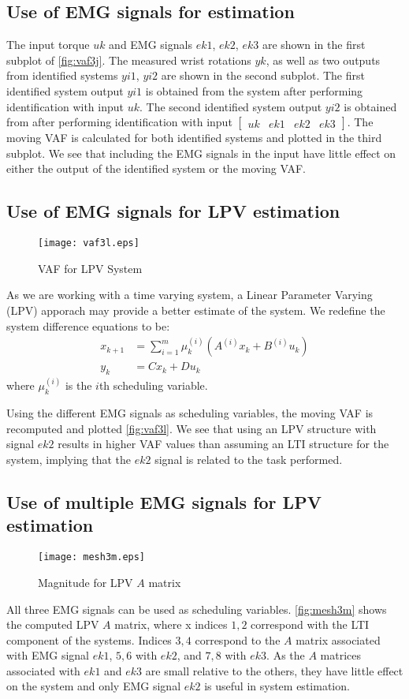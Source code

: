 \documentclass[11pt,a4paper]{article}
\begin{document}
\subsection{Use of EMG signals for estimation}
The input torque $uk$ and EMG signals $ek1$, $ek2$, $ek3$ are shown in the
first subplot of \autoref{fig:vaf3j}. The measured wrist rotations $yk$, as
well as two outputs from identified systems $yi1$, $yi2$ are shown in the
second subplot. The first identified system output $yi1$ is obtained from the
system after performing identification with input $uk$. The second identified
system output $yi2$ is obtained from after performing identification with input
$\begin{bmatrix} uk & ek1 & ek2 & ek3 \end{bmatrix}$. The moving VAF is
calculated for both identified systems and plotted in the third subplot. We see
that including the EMG signals in the input have little effect on either the
output of the identified system or the moving VAF.

\subsection{Use of EMG signals for LPV estimation}
\begin{figure}
    \centering
    \texttt{[image: vaf3l.eps]}
    \caption{VAF for LPV System}
    \label{fig:vaf3l}
\end{figure}
As we are working with a time varying system, a Linear Parameter Varying (LPV)
apporach may provide a better estimate of the system. We redefine the system
difference equations to be:
\begin{align}
    x_{k + 1} &= \sum_{i = 1}^m \mu_k^{(i)} (A^{(i)} x_k + B^{(i)} u_k) \\
    y_k &= C x_k + D u_k
\end{align}
where $\mu_k^{(i)}$ is the $i$th scheduling variable.

Using the different EMG signals as scheduling variables, the moving VAF is
recomputed and plotted \autoref{fig:vaf3l}. We see that using an LPV structure
with signal $ek2$ results in higher VAF values than assuming an LTI structure
for the system, implying that the $ek2$ signal is related to the task
performed.

\subsection{Use of multiple EMG signals for LPV estimation}
\begin{figure}
    \centering
    \texttt{[image: mesh3m.eps]}
    \caption{Magnitude for LPV $A$ matrix}
    \label{fig:mesh3m}
\end{figure}
All three EMG signals can be used as scheduling variables. \autoref{fig:mesh3m}
shows the computed LPV $A$ matrix, where x indices $1, 2$ correspond with the
LTI component of the systems. Indices $3, 4$ correspond to the $A$ matrix
associated with EMG signal $ek1$, $5, 6$ with $ek2$, and $7, 8$ with $ek3$. As
the $A$ matrices associated with $ek1$ and $ek3$ are small relative to the
others, they have little effect on the system and only EMG signal $ek2$ is
useful in system estimation.
\end{document}

